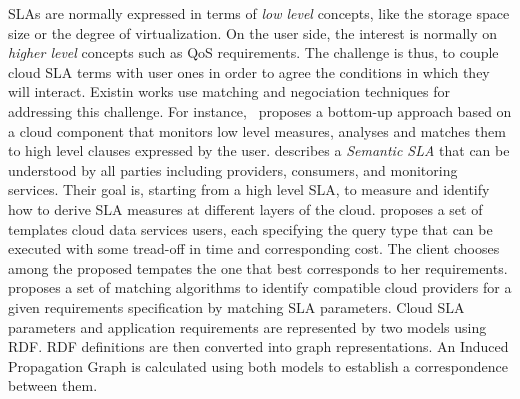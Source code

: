 


SLAs are normally expressed in terms of \textit{low level} concepts, like the storage space size  or the degree of virtualization. 
On the user side, the interest is normally on \textit{higher level} concepts such as QoS requirements.
The challenge is thus, to couple cloud SLA terms with user ones in order to agree the conditions in which they will interact. Existin works use matching and negociation techniques for addressing this challenge.  
For instance,~\cite{5547150} 
proposes a bottom-up approach based on a cloud component that monitors low level measures, analyses and matches them to high level clauses expressed by the user.
  \cite{Dastjerdi:2012:DOA:2275356.2275360} describes a \textit{Semantic SLA} that can be understood by all parties including providers, consumers, and monitoring services.
Their goal is, starting from a high level SLA, to measure and identify how to derive SLA measures  at different layers of the cloud.  \cite{Ortiz:2013:VPS:2486767.2486772}
  proposes a set of templates  cloud data services users, each specifying the query type that can be executed with some tread-off in time and corresponding cost.  The client  chooses among the proposed tempates the one that best corresponds   to her requirements. \cite{6141307} proposes a set of matching algorithms to identify compatible cloud providers for a given requirements specification by matching SLA parameters. Cloud SLA parameters and application requirements are represented by two models using RDF. RDF definitions are then converted into graph representations. An Induced Propagation Graph is calculated using both models to establish a correspondence between them.


